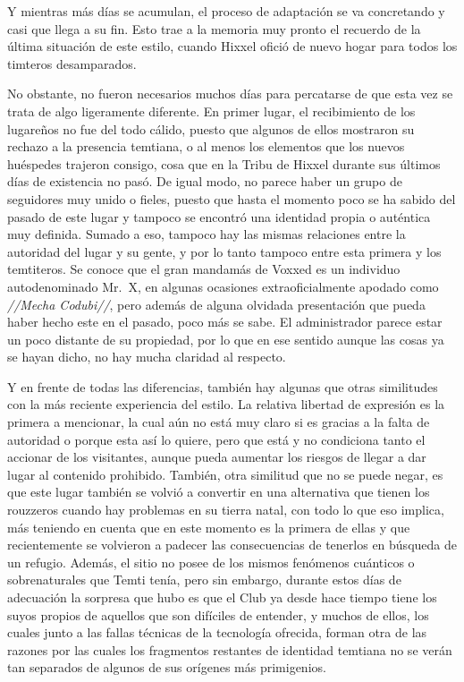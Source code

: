 \documentclass[
  spanish,
]{book}
\begin{document}
Y mientras más días se acumulan, el proceso de adaptación se va concretando y casi que llega a su fin. Esto trae a la memoria muy pronto el recuerdo de la última situación de este estilo, cuando Hixxel ofició de nuevo hogar para todos los timteros desamparados.

No obstante, no fueron necesarios muchos días para percatarse de que esta vez se trata de algo ligeramente diferente. En primer lugar, el recibimiento de los lugareños no fue del todo cálido, puesto que algunos de ellos mostraron su rechazo a la presencia temtiana, o al menos los elementos que los nuevos huéspedes trajeron consigo, cosa que en la Tribu de Hixxel durante sus últimos días de existencia no pasó. De igual modo, no parece haber un grupo de seguidores muy unido o fieles, puesto que hasta el momento poco se ha sabido del pasado de este lugar y tampoco se encontró una identidad propia o auténtica muy definida. Sumado a eso, tampoco hay las mismas relaciones entre la autoridad del lugar y su gente, y por lo tanto tampoco entre esta primera y los temtiteros. Se conoce que el gran mandamás de Voxxed es un individuo autodenominado Mr.~X, en algunas ocasiones extraoficialmente apodado como \emph{//Mecha Codubi//}, pero además de alguna olvidada presentación que pueda haber hecho este en el pasado, poco más se sabe. El administrador parece estar un poco distante de su propiedad, por lo que en ese sentido aunque las cosas ya se hayan dicho, no hay mucha claridad al respecto.

Y en frente de todas las diferencias, también hay algunas que otras similitudes con la más reciente experiencia del estilo. La relativa libertad de expresión es la primera a mencionar, la cual aún no está muy claro si es gracias a la falta de autoridad o porque esta así lo quiere, pero que está y no condiciona tanto el accionar de los visitantes, aunque pueda aumentar los riesgos de llegar a dar lugar al contenido prohibido. También, otra similitud que no se puede negar, es que este lugar también se volvió a convertir en una alternativa que tienen los rouzzeros cuando hay problemas en su tierra natal, con todo lo que eso implica, más teniendo en cuenta que en este momento es la primera de ellas y que recientemente se volvieron a padecer las consecuencias de tenerlos en búsqueda de un refugio. Además, el sitio no posee de los mismos fenómenos cuánticos o sobrenaturales que Temti tenía, pero sin embargo, durante estos días de adecuación la sorpresa que hubo es que el Club ya desde hace tiempo tiene los suyos propios de aquellos que son difíciles de entender, y muchos de ellos, los cuales junto a las fallas técnicas de la tecnología ofrecida, forman otra de las razones por las cuales los fragmentos restantes de identidad temtiana no se verán tan separados de algunos de sus orígenes más primigenios.
\end{document}
